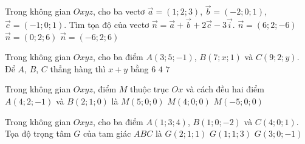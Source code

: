 \begin{ex}%
Trong không gian $Oxyz$, cho ba vectơ $\overrightarrow{a}=(1; 2; 3)$, $\overrightarrow{b}=(-2; 0; 1)$,  $\overrightarrow{c}=(-1; 0; 1)$. Tìm tọa độ của vectơ $\overrightarrow{n}=\overrightarrow{a}+\overrightarrow{b}+2\overrightarrow{c}-3\overrightarrow{i}$.
 {$\overrightarrow{n}=(6; 2; -6)$}
 {$\overrightarrow{n}=(0; 2; 6)$}
 {\True $\overrightarrow{n}=(-6; 2; 6)$}
\end{ex}

\begin{ex}%
Trong không gian $Oxyz$, cho ba điểm $A(3; 5; -1)$, $B(7; x; 1)$ và $C(9; 2; y)$. Để $A$, $B$, $C$ thẳng hàng thì $x+y$ bằng
 {$6$}
 {$4$}
 {$7$}
\end{ex}

\begin{ex}%
Trong không gian $Oxyz$, điểm $M$ thuộc trục $Ox$ và cách đều hai điểm $A(4; 2; -1)$ và $B(2; 1; 0)$ là
 {$M(5; 0; 0)$}
 {\True $M(4; 0; 0)$}
 {$M(-5; 0; 0)$}
\end{ex}

\begin{ex}%
Trong không gian $Oxyz$, cho ba điểm $A(1; 3; 4)$, $B(1; 0; -2)$ và $C(4; 0; 1)$. Tọa độ trọng tâm $G$ của tam giác $ABC$ là
 {\True $G(2; 1; 1)$}
 {$G(1; 1; 3)$}
 {$G(3; 0; -1)$}
\end{ex}

